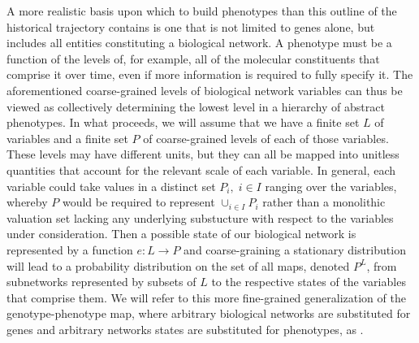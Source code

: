 A more realistic basis upon which to build phenotypes than this outline of the historical trajectory contains is one that is not limited to genes alone, but includes all entities constituting a biological network. A phenotype must be a function of the levels of, for example, all of the molecular constituents that comprise it over time, even if more information is required to fully specify it.  The aforementioned coarse-grained levels of biological network variables can thus be viewed as collectively determining the lowest level in a hierarchy of abstract phenotypes. In what proceeds, we will assume that we have a finite set $L$ of variables and a finite set $P$ of coarse-grained levels of each of those variables. These levels may have different units, but they can all be mapped into unitless quantities that account for the relevant scale of each variable. In general, each variable could take values in a distinct set $P_i, \; i \in I$ ranging over the variables, whereby $P$ would be required to represent $\cup_{i \in I} P_i$ rather than a monolithic valuation set lacking any underlying substucture with respect to the variables under consideration.
Then a possible state of our biological network is represented by a function $e : L \to P$ and coarse-graining a stationary distribution will lead to a probability distribution on the set of all maps, denoted $P^L$, from subnetworks represented by subsets of $L$ to the respective states of the variables that comprise them. We will refer to this more fine-grained generalization of the genotype-phenotype map, where arbitrary biological networks are substituted for genes and arbitrary networks states are substituted for phenotypes, as \gnpm{}.



